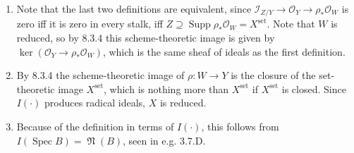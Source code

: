 \documentclass{report}
\renewcommand{\set}{{\mathrm{set}}} %
\newcommand{\I}{\mathscr{I}}
\renewcommand{\O}{\mathscr{O}} %
\DeclareMathOperator{\Supp}{Supp}
\DeclareMathOperator{\Spec}{Spec}
\DeclareMathOperator{\nilrad}{\mathfrak{N}}
\begin{document}
\begin{enumerate}[label=\textbf{8.3.\Alph*.}]
	\item Note that the last two definitions are equivalent, since
	      $\I_{Z/Y}\to\O_Y\to\rho_*\O_W$ is zero iff it is zero in every stalk,
	      iff $Z\supseteq\Supp\rho_*\O_W=X^\set$. Note that $W$ is reduced, so by
	      8.3.4 this scheme-theoretic image is given by $\ker(\O_Y\to\rho_*\O_W)$,
	      which is the same sheaf of ideals as the first definition.

	\item By 8.3.4 the scheme-theoretic image of $\rho:W\to Y$ is the closure of
	      the set-theoretic image $X^\set$, which is nothing more than $X^\set$ if
	      $X^\set$ is closed. Since $I(\cdot)$ produces radical ideals, $X$ is
	      reduced.

	\item Because of the definition in terms of $I(\cdot)$, this follows from
	      $I(\Spec B)=\nilrad(B)$, seen in e.g. 3.7.D.
\end{enumerate}
\end{document}
